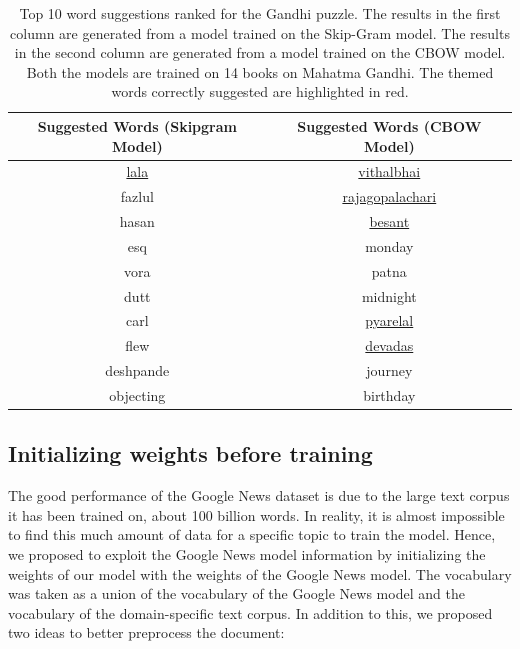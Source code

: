 \documentclass[twoside]{article}
\begin{document}
\begin{table}[h!]
  \begin{center}
    \begin{tabular}{c c}
      \toprule
      \textbf{Suggested Words (Skipgram Model)} & \textbf{Suggested Words (CBOW Model)}  \\ 
      \midrule
      \ul{lala} & \ul{vithalbhai} \\
      fazlul & \ul{rajagopalachari} \\
      hasan & \ul{besant}\\
      esq & monday\\
      vora & patna \\
      dutt & midnight \\
      carl & \ul{pyarelal} \\
      flew & \ul{devadas} \\
      deshpande & journey \\
      objecting & birthday \\
      \bottomrule
    \end{tabular}
    \caption{Top 10 word suggestions ranked for the Gandhi puzzle. The results in the first column are generated from a model trained on the Skip-Gram model. The results in the second column are generated from a model trained on the CBOW model. Both the models are trained on 14 books on Mahatma Gandhi. The themed words correctly suggested are highlighted in red.}
    \label{tab:table9}
  \end{center}
\end{table}  

\subsection{Initializing weights before training}
The good performance of the Google News dataset is due to the large text corpus it has been trained on, about 100 billion words. In reality, it is almost impossible to find this much amount of data for a specific topic to train the model. Hence, we proposed to exploit the Google News model information by initializing the weights of our model with the weights of the Google News model. The vocabulary was taken as a union of the vocabulary of the Google News model and the vocabulary of the domain-specific text corpus. In addition to this, we proposed two ideas to better preprocess the document:
\end{document}
